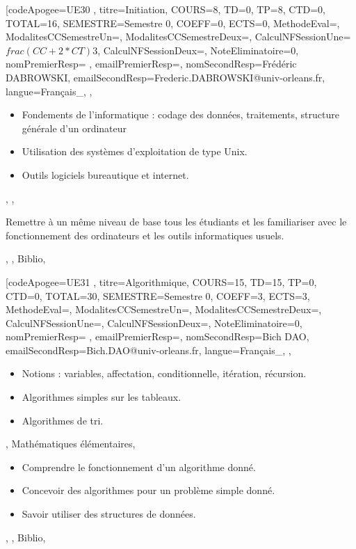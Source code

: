 \vfill


\module[codeApogee={UE30 },
titre={Initiation},
COURS={8},
TD={0},
TP={8},
CTD={0},
TOTAL={16},
SEMESTRE={Semestre 0},
COEFF={0},
ECTS={0},
MethodeEval={},
ModalitesCCSemestreUn={},
ModalitesCCSemestreDeux={},
CalculNFSessionUne={$frac{(CC+2*CT)}{3}$},
CalculNFSessionDeux={},
NoteEliminatoire={0},
nomPremierResp={ },
emailPremierResp={},
nomSecondResp={Frédéric DABROWSKI},
emailSecondResp={Frederic.DABROWSKI@univ-orleans.fr},
langue={Français_},
{},
{\begin{itemize}
\item Fondements de l'informatique : codage des données, traitements, structure générale d'un ordinateur
  \item Utilisation des systèmes d'exploitation de type Unix.
  \item Outils logiciels bureautique et internet.
\end{itemize}},
{},
{\begin{itemize}
\ObjItem Remettre à un même niveau de base tous les étudiants et les familiariser avec le fonctionnement des ordinateurs et les outils informatiques usuels.
\end{itemize}},
{},
{Biblio},

\vfill


\module[codeApogee={UE31 },
titre={Algorithmique},
COURS={15},
TD={15},
TP={0},
CTD={0},
TOTAL={30},
SEMESTRE={Semestre 0},
COEFF={3},
ECTS={3},
MethodeEval={},
ModalitesCCSemestreUn={},
ModalitesCCSemestreDeux={},
CalculNFSessionUne={},
CalculNFSessionDeux={},
NoteEliminatoire={0},
nomPremierResp={ },
emailPremierResp={},
nomSecondResp={Bich DAO},
emailSecondResp={Bich.DAO@univ-orleans.fr},
langue={Français_},
{},
{\begin{itemize}
\item Notions : variables, affectation, conditionnelle, itération, récursion.
  \item Algorithmes simples sur les tableaux.
  \item Algorithmes de tri.
\end{itemize}},
{Mathématiques élémentaires},
{\begin{itemize}
\item Comprendre le fonctionnement d'un algorithme donné.
  \item Concevoir des algorithmes pour un problème simple donné.
  \item Savoir utiliser des structures de données.
\end{itemize}},
{},
{Biblio},

